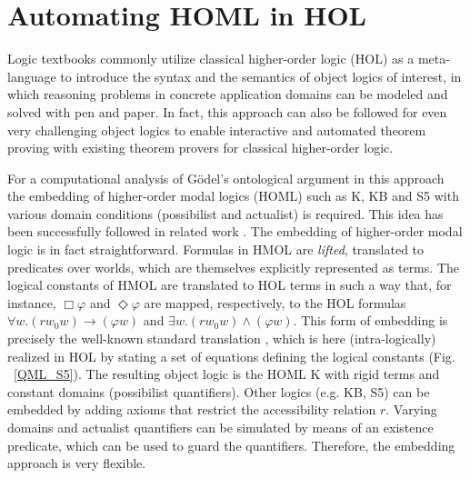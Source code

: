 \documentclass{article}
\newcommand{\imp}{\rightarrow}
\begin{document}








\section{Automating HOML in HOL}

Logic textbooks \cite{ToDo:which} commonly utilize classical higher-order logic (HOL)
\cite{Church40} as a meta-language to introduce the syntax and the
semantics of object logics of interest, in which reasoning
problems in concrete application domains can be modeled and solved
with pen and paper. In fact, this approach can also be followed for even very challenging
object logics to
enable interactive and automated theorem proving with existing theorem provers for classical
higher-order logic.


For a computational analysis of G\"odel's ontological argument in this
approach the embedding of higher-order modal logics (HOML) such as K,
KB and S5 with various domain conditions (possibilist and actualist)
is required. This idea has been successfully followed in related work
\cite{C40}. The embedding of higher-order modal logic is in fact
straightforward. Formulas in HMOL are \emph{lifted}, translated to predicates
over worlds, which are themselves explicitly represented as
terms. The logical constants of HMOL are translated to HOL terms in such a way that, for instance, 
$\Box \varphi$ and $\Diamond \varphi$ are mapped, respectively, to the
HOL formulas $\forall w. (r w_0 w) \imp (\varphi w)$ and $\exists
w. (r w_0 w) \wedge (\varphi w)$. This form of embedding is precisely
the well-known standard translation
\cite{DBLP:journals/logcom/Ohlbach91}, which is here (intra-logically)
realized in HOL by stating a set of equations defining the logical
constants (Fig. ~\ref{QML_S5}). The resulting object logic is the HOML
K with rigid terms and constant domains (possibilist
quantifiers). Other logics (e.g. KB, S5) can be embedded by adding
axioms that restrict the accessibility relation $r$. Varying domains
and actualist quantifiers can be simulated by means of an existence
predicate, which can be used to guard the quantifiers. Therefore, the
embedding approach is very flexible.
\end{document}
